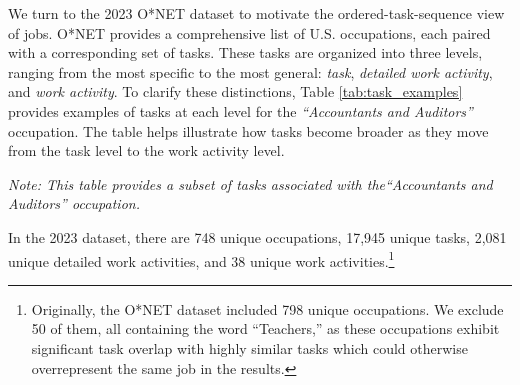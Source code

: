 \documentclass{article}
\theoremstyle{plain}
\theoremstyle{plain}
\begin{document}
We turn to the 2023 O*NET dataset to motivate the ordered-task-sequence view of jobs. 
O*NET provides a comprehensive list of U.S. occupations, each paired with a corresponding set of tasks. 
These tasks are organized into three levels, ranging from the most specific to the most general: \textit{task}, \textit{detailed work activity}, and \textit{work activity}.
To clarify these distinctions, Table \ref{tab:task_examples} provides examples of tasks at each level for the \textit{``Accountants and Auditors''} occupation. 
The table helps illustrate how tasks become broader as they move from the task level to the work activity level.
\begin{table}[htbp]
\begin{center}
\caption{Examples of Tasks, Detailed Work Activities, and Work Activities}
\label{tab:task_examples}
\end{center}
\vspace{-0.15cm}
\textit{Note: This table provides a subset of tasks associated with the``Accountants and Auditors'' occupation.}
\end{table}
In the 2023 dataset, there are 748 unique occupations, 17,945 unique tasks, 2,081 unique detailed work activities, and 38 unique work activities.\footnote{Originally, the O*NET dataset included 798 unique occupations. We exclude 50 of them, all containing the word ``Teachers,'' as these occupations exhibit significant task overlap with highly similar tasks which could otherwise overrepresent the same job in the results.}
\end{document}
